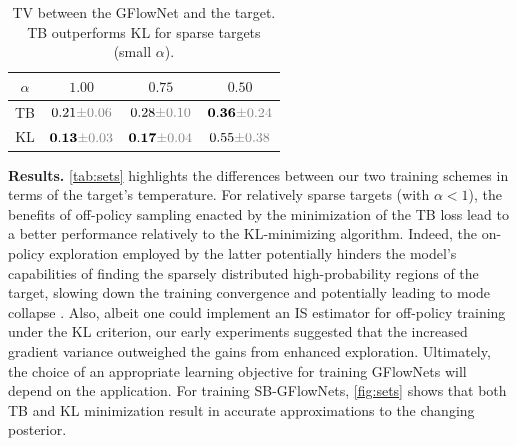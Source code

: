 \documentclass{article}
\newcommand{\pp}[1]{\vspace{0pt}\noindent\textbf{#1}}
\theoremstyle{plain}
\theoremstyle{definition}
\theoremstyle{remark}
\theoremstyle{remark}
\begin{document}
\captionsetup[table]{font=small}
\begin{table} 
    \centering
    \vspace{-12pt} 
    \caption{TV between the GFlowNet and the target. TB outperforms KL for sparse targets (small $\alpha$).} 
    \begin{tabular}{c|c|c|c}
         $\alpha$ &  $1.00$ & $0.75$ & $0.50$ \\
         \hline 
         TB & $0.21\textcolor{gray} { { \scriptstyle \pm 0.06 } }$& $0.28\textcolor{gray}{ {\scriptstyle \pm 0.10}}$ & $\mathbf{0.36}\textcolor{gray} {{\scriptstyle \pm  0.24}}$ \\ 
         KL & $\mathbf{0.13} \textcolor {gray} { { \scriptstyle \pm 0.03 } }$ & $\mathbf{0.17} \textcolor {gray} { { \scriptstyle \pm 0.04 } }$ & $0.55 \textcolor {gray} { { \scriptstyle \pm 0.38 } }$ 
    \end{tabular}
    \label{tab:sets}
\end{table}
\captionsetup[table]{font=normal}
\pp{Results.} \autoref{tab:sets} highlights the differences between our two training schemes in terms of the target's temperature. For relatively sparse targets (with $\alpha < 1$), the benefits of off-policy sampling enacted by the minimization of the TB loss lead to a better performance relatively to the KL-minimizing algorithm. Indeed, the on-policy exploration employed by the latter potentially hinders the model's capabilities of finding the sparsely distributed high-probability regions of the target, slowing down the training convergence and potentially leading to mode collapse \cite{malkin2023gflownets}. Also, albeit one could implement an IS estimator for off-policy training under the KL criterion, our early experiments suggested that the increased gradient variance outweighed the gains from enhanced exploration. Ultimately, the choice of an appropriate learning objective for training GFlowNets will depend on the application. For training SB-GFlowNets, \autoref{fig:sets} shows that both TB and KL minimization result in accurate approximations to the changing posterior.  


\end{document}
